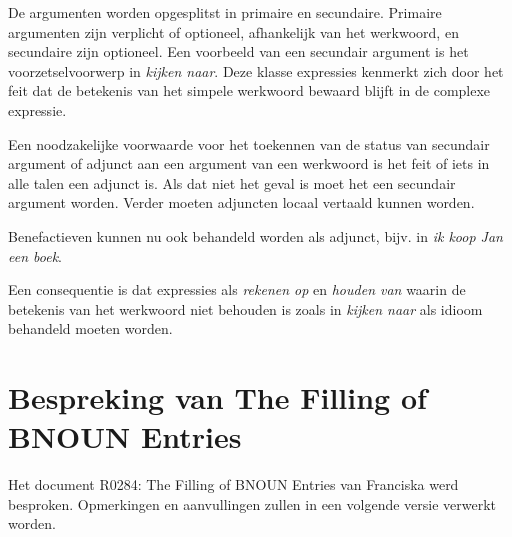 De argumenten worden opgesplitst in primaire en secundaire. Primaire argumenten 
zijn verplicht of optioneel, afhankelijk van het werkwoord, en secundaire zijn
optioneel. Een voorbeeld van een secundair argument is het voorzetselvoorwerp 
in {\em kijken naar}. Deze klasse expressies kenmerkt zich door het feit dat de 
betekenis van het simpele werkwoord bewaard blijft in de complexe expressie.

Een noodzakelijke voorwaarde voor het toekennen van de status van secundair
argument of adjunct aan een argument van een werkwoord is het feit of iets in
alle talen een adjunct is. Als dat niet het geval is moet het een secundair
argument worden. Verder moeten adjuncten locaal vertaald kunnen worden. 

Benefactieven kunnen nu ook behandeld worden als adjunct, bijv. in {\em ik koop 
Jan een boek}.

Een consequentie is dat expressies als {\em rekenen op} en {\em houden van} 
waarin de betekenis van het werkwoord niet behouden is zoals in {\em kijken 
naar} als idioom behandeld moeten worden.

\section{Bespreking van The Filling of BNOUN Entries}
Het document R0284: The Filling of BNOUN Entries van Franciska werd besproken. 
Opmerkingen en aanvullingen zullen in een volgende versie verwerkt worden.





